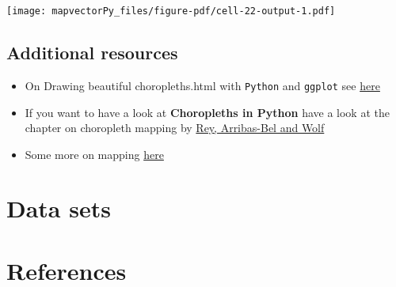 \documentclass[
  letterpaper,
  DIV=11,
  numbers=noendperiod]{scrreprt}
\newlength{\cslhangindent}
\newenvironment{CSLReferences}[2] %
 {\begin{list}{}{%
  \setlength{\itemindent}{0pt}
  \setlength{\leftmargin}{0pt}
  \setlength{\parsep}{0pt}
  \ifodd #1
   \setlength{\leftmargin}{\cslhangindent}
   \setlength{\itemindent}{-1\cslhangindent}
  \fi
  \setlength{\itemsep}{#2\baselineskip}}}
 {\end{list}}
\begin{document}
\texttt{[image: mapvectorPy\_files/figure-pdf/cell-22-output-1.pdf]}

\section*{Additional resources}\label{additional-resources-1}


\begin{itemize}
\item
  On Drawing beautiful choropleths.html with \texttt{Python} and
  \texttt{ggplot} see
  \href{https://geopandas.org/en/stable/gallery/choropleths.html}{here}
\item
  If you want to have a look at \textbf{Choropleths in Python} have a
  look at the chapter on choropleth mapping by
  \href{https://geographicdata.science/book/notebooks/05_choropleth.html}{Rey,
  Arribas-Bel and Wolf}
\item
  Some more on mapping
  \href{https://geopandas.org/en/stable/docs/user_guide/mapping.html}{here}
\end{itemize}


\chapter*{Data sets}\label{data-sets}



\chapter*{References}\label{references}


\label{refs}
\begin{CSLReferences}{0}{1}
\end{CSLReferences}
\end{document}
